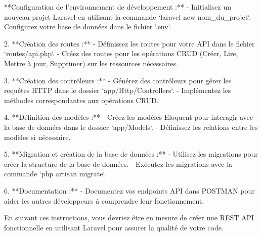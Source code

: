 **Configuration de l'environnement de développement :**
   - Initialisez un nouveau projet Laravel en utilisant la commande `laravel new nom_du_projet`.
   - Configurez votre base de données dans le fichier `.env`.

2. **Création des routes :**
   - Définissez les routes pour votre API dans le fichier `routes/api.php`.
   - Créez des routes pour les opérations CRUD (Créer, Lire, Mettre à jour, Supprimer) sur les ressources nécessaires.

3. **Création des contrôleurs :**
   - Générez des contrôleurs pour gérer les requêtes HTTP dans le dossier `app/Http/Controllers`.
   - Implémentez les méthodes correspondantes aux opérations CRUD.

4. **Définition des modèles :**
   - Créez les modèles Eloquent pour interagir avec la base de données dans le dossier `app/Models`.
   - Définissez les relations entre les modèles si nécessaire.

5. **Migration et création de la base de données :**
   - Utilisez les migrations pour créer la structure de la base de données.
   - Exécutez les migrations avec la commande `php artisan migrate`.

6. **Documentation :**
    - Documentez vos endpoints API dans POSTMAN pour aider les autres développeurs à comprendre leur fonctionnement.

En suivant ces instructions, vous devriez être en mesure de créer une REST API fonctionnelle en utilisant Laravel pour assurer la qualité de votre code.